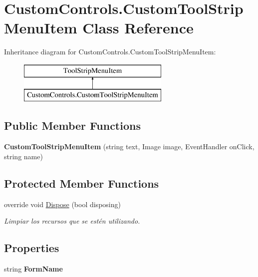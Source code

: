 \hypertarget{class_custom_controls_1_1_custom_tool_strip_menu_item}{}\section{Custom\+Controls.\+Custom\+Tool\+Strip\+Menu\+Item Class Reference}
\label{class_custom_controls_1_1_custom_tool_strip_menu_item}
Inheritance diagram for Custom\+Controls.\+Custom\+Tool\+Strip\+Menu\+Item\+:\begin{figure}[H]
\begin{center}
\leavevmode
\includegraphics[height=2.000000cm]{class_custom_controls_1_1_custom_tool_strip_menu_item}
\end{center}
\end{figure}
\subsection*{Public Member Functions}
\begin{DoxyCompactItemize}
\item 
\mbox{\label{class_custom_controls_1_1_custom_tool_strip_menu_item_a3b07c5d51a0a1b0d2c1bfa23489e0454}} 
{\bfseries Custom\+Tool\+Strip\+Menu\+Item} (string text, Image image, Event\+Handler on\+Click, string name)
\end{DoxyCompactItemize}
\subsection*{Protected Member Functions}
\begin{DoxyCompactItemize}
\item 
override void \mbox{\hyperlink{class_custom_controls_1_1_custom_tool_strip_menu_item_a09da84511dccda9f78441c82ff2f4508}{Dispose}} (bool disposing)
\begin{DoxyCompactList}\small\item\em Limpiar los recursos que se estén utilizando. \end{DoxyCompactList}\end{DoxyCompactItemize}
\subsection*{Properties}
\begin{DoxyCompactItemize}
\item 
\mbox{\label{class_custom_controls_1_1_custom_tool_strip_menu_item_a2533ed0f2c4c4b248b1abc49e716c2a6}} 
string {\bfseries Form\+Name}
\end{DoxyCompactItemize}


